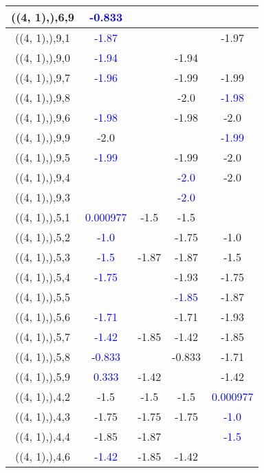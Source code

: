 \documentclass{article}
\begin{document}
\begin{center}
\begin{longtable}{|c|c|c|c|c|}
        	\hline
        	((4, 1),),6,9& \textcolor{blue}{-0.833}&&&\\
        	\hline
        	((4, 1),),9,1& \textcolor{blue}{-1.87}&&&-1.97\\
        	\hline
        	((4, 1),),9,0& \textcolor{blue}{-1.94}&&-1.94&\\
        	\hline
        	((4, 1),),9,7& \textcolor{blue}{-1.96}&&-1.99&-1.99\\
        	\hline
        	((4, 1),),9,8&&&-2.0& \textcolor{blue}{-1.98}\\
        	\hline
        	((4, 1),),9,6& \textcolor{blue}{-1.98}&&-1.98&-2.0\\
        	\hline
        	((4, 1),),9,9&-2.0&&& \textcolor{blue}{-1.99}\\
        	\hline
        	((4, 1),),9,5& \textcolor{blue}{-1.99}&&-1.99&-2.0\\
        	\hline
        	((4, 1),),9,4&&& \textcolor{blue}{-2.0}&-2.0\\
        	\hline
        	((4, 1),),9,3&&& \textcolor{blue}{-2.0}&\\
        	\hline
        	((4, 1),),5,1& \textcolor{blue}{0.000977}&-1.5&-1.5&\\
        	\hline
        	((4, 1),),5,2& \textcolor{blue}{-1.0}&&-1.75&-1.0\\
        	\hline
        	((4, 1),),5,3& \textcolor{blue}{-1.5}&-1.87&-1.87&-1.5\\
        	\hline
        	((4, 1),),5,4& \textcolor{blue}{-1.75}&&-1.93&-1.75\\
        	\hline
        	((4, 1),),5,5&&& \textcolor{blue}{-1.85}&-1.87\\
        	\hline
        	((4, 1),),5,6& \textcolor{blue}{-1.71}&&-1.71&-1.93\\
        	\hline
        	((4, 1),),5,7& \textcolor{blue}{-1.42}&-1.85&-1.42&-1.85\\
        	\hline
        	((4, 1),),5,8& \textcolor{blue}{-0.833}&&-0.833&-1.71\\
        	\hline
        	((4, 1),),5,9& \textcolor{blue}{0.333}&-1.42&&-1.42\\
        	\hline
        	((4, 1),),4,2&-1.5&-1.5&-1.5& \textcolor{blue}{0.000977}\\
        	\hline
        	((4, 1),),4,3&-1.75&-1.75&-1.75& \textcolor{blue}{-1.0}\\
        	\hline
        	((4, 1),),4,4&-1.85&-1.87&& \textcolor{blue}{-1.5}\\
        	\hline
        	((4, 1),),4,6& \textcolor{blue}{-1.42}&-1.85&-1.42&\\

\end{longtable}
\end{center}
\end{document}
